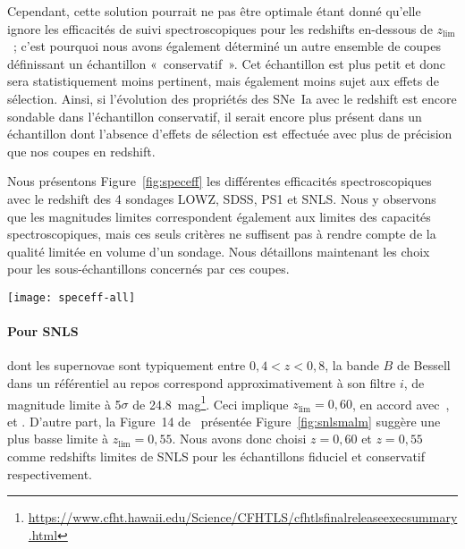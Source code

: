 \documentclass[../main/main.tex]{subfiles}
\begin{document}
Cependant, cette solution pourrait ne pas être optimale étant donné qu'elle
ignore les efficacités de suivi spectroscopiques pour les redshifts en-dessous
de $z_{\lim}$~; c'est pourquoi nous avons également déterminé un autre ensemble
de coupes définissant un échantillon «~conservatif~». Cet échantillon est plus
petit et donc sera statistiquement moins pertinent, mais également moins sujet
aux effets de sélection. Ainsi, si l'évolution des propriétés des SNe~Ia avec le
redshift est encore sondable dans l'échantillon conservatif, il serait encore
plus présent dans un échantillon dont l'absence d'effets de sélection est
effectuée avec plus de précision que nos coupes en redshift.

Nous présentons Figure~\ref{fig:speceff} les différentes efficacités
spectroscopiques avec le redshift des 4 sondages LOWZ, SDSS, PS1 et SNLS. Nous y
observons que les magnitudes limites correspondent également aux limites des
capacités spectroscopiques, mais ces seuls critères ne suffisent pas à rendre
compte de la qualité limitée en volume d'un sondage. Nous détaillons maintenant
les choix pour les sous-échantillons concernés par ces coupes.

\begin{SCfigure}[1][h!]
    \centering
    \texttt{[image: speceff-all]}
    \caption[Comparaison des efficacités spectroscopiques des différents
    sondages]{Comparaison des efficacités spectroscopiques des différents
        sondages. Figure produite avec les données de la collaboration
        \textit{Dark Energy Survey} \citep[DES,][]{abbott2019} pour LOWZ, de
        Pantheon \citep{scolnic2018} pour PS1, et de Pantheon+
    \citep{popovic2021b} pour SDSS et SNLS.}
    \label{fig:speceff}
\end{SCfigure}

\paragraph*{Pour SNLS} dont les supernovae sont typiquement entre $0,4 < z <
0,8$, la bande $B$ de Bessell dans un référentiel au repos correspond
approximativement à son filtre $i$, de magnitude limite à 5$\sigma$ de
\SI{24,8}{mag}\footnote{\href{
    https://www.cfht.hawaii.edu/Science/CFHTLS/cfhtlsfinalreleaseexecsummary.html}
{https://www.cfht.hawaii.edu/Science/CFHTLS/cfhtlsfinalreleaseexecsummary.html}}.
Ceci implique $z_{\lim} = 0,60$, en accord avec~\cite{neill2006, perrett2010},
et \citep[Section~2.2]{conley2011}. D'autre part, la Figure~14
de~\cite{perrett2010} présentée Figure~\ref{fig:snlsmalm} suggère une plus
basse limite à $z_{\lim} = 0,55$. Nous avons donc choisi $z=0,60$ et $z=0,55$
comme redshifts limites de SNLS pour les échantillons fiduciel et conservatif
respectivement.
\end{document}
